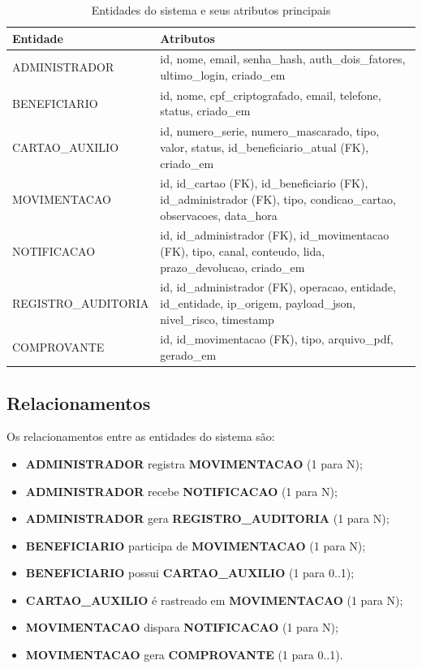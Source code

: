 \documentclass[
  article,
  a4paper,
  12pt,
  oneside,
  fleqn
]{abntex2}
\begin{document}
\begin{table}[htb]
\caption{\label{tab:entidades}Entidades do sistema e seus atributos principais}
\centering
\footnotesize
\begin{tabular}{p{4cm}p{10cm}}
\toprule
\textbf{Entidade} & \textbf{Atributos} \\
\midrule
ADMINISTRADOR & id, nome, email, senha\_hash, auth\_dois\_fatores, ultimo\_login, criado\_em \\
\midrule
BENEFICIARIO & id, nome, cpf\_criptografado, email, telefone, status, criado\_em \\
\midrule
CARTAO\_AUXILIO & id, numero\_serie, numero\_mascarado, tipo, valor, status, id\_beneficiario\_atual (FK), criado\_em \\
\midrule
MOVIMENTACAO & id, id\_cartao (FK), id\_beneficiario (FK), id\_administrador (FK), tipo, condicao\_cartao, observacoes, data\_hora \\
\midrule
NOTIFICACAO & id, id\_administrador (FK), id\_movimentacao (FK), tipo, canal, conteudo, lida, prazo\_devolucao, criado\_em \\
\midrule
REGISTRO\_AUDITORIA & id, id\_administrador (FK), operacao, entidade, id\_entidade, ip\_origem, payload\_json, nivel\_risco, timestamp \\
\midrule
COMPROVANTE & id, id\_movimentacao (FK), tipo, arquivo\_pdf, gerado\_em \\
\bottomrule
\end{tabular}
\end{table}

\subsection{Relacionamentos}

Os relacionamentos entre as entidades do sistema são:

\begin{itemize}
    \item \textbf{ADMINISTRADOR} registra \textbf{MOVIMENTACAO} (1 para N);
    \item \textbf{ADMINISTRADOR} recebe \textbf{NOTIFICACAO} (1 para N);
    \item \textbf{ADMINISTRADOR} gera \textbf{REGISTRO\_AUDITORIA} (1 para N);
    \item \textbf{BENEFICIARIO} participa de \textbf{MOVIMENTACAO} (1 para N);
    \item \textbf{BENEFICIARIO} possui \textbf{CARTAO\_AUXILIO} (1 para 0..1);
    \item \textbf{CARTAO\_AUXILIO} é rastreado em \textbf{MOVIMENTACAO} (1 para N);
    \item \textbf{MOVIMENTACAO} dispara \textbf{NOTIFICACAO} (1 para N);
    \item \textbf{MOVIMENTACAO} gera \textbf{COMPROVANTE} (1 para 0..1).
\end{itemize}
\end{document}
